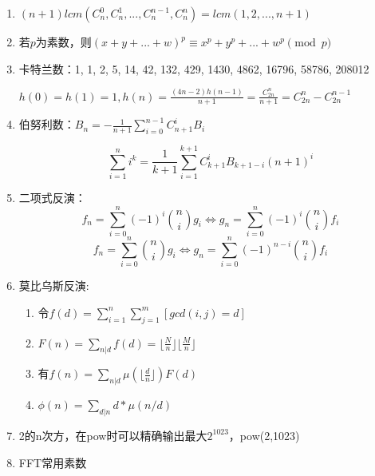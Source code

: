 \documentclass[twoside]{article}
\begin{document}
\begin{enumerate}
\item $(n+1)lcm(C_n^0,C_n^1,...,C_n^{n-1},C_n^{n})=lcm(1,2,...,n+1)$

\item 若$p$为素数，则$(x+y+...+w)^p\equiv x^p+y^p+...+w^p\pmod p$

\item 卡特兰数：1, 1, 2, 5, 14, 42, 132, 429, 1430, 4862, 16796, 58786, 208012

$h(0)=h(1)=1,h(n)=\frac{(4n-2)h(n-1)}{n+1}=\frac{C_{2n}^n}{n+1}=C_{2n}^n-C_{2n}^{n-1}$

\item 伯努利数：$B_n = -\frac{1}{n+1} \sum_{i=0}^{n-1} C_{n+1}^i B_i$

$$\sum_{i=1}^n i^k = \frac{1}{k+1} \sum_{i=1}^{k+1}C_{k+1}^i B_{k+1-i}(n+1)^i$$

\item 二项式反演：$$f_n = \sum_{i = 0} ^ n (-1) ^ i \binom{n}{i} g_i \Leftrightarrow g_n = \sum_{i = 0} ^ n (-1) ^ i \binom{n}{i} f_i$$
$$f_n = \sum_{i = 0} ^ n \binom{n}{i} g_i \Leftrightarrow g_n = \sum_{i = 0} ^ n (-1) ^ {n - i} \binom{n}{i} f_i$$

\item 莫比乌斯反演:
\begin{enumerate}
\item 令$f(d)=\sum_{i=1}^{n}\sum_{j=1}^{m}[gcd(i,j)=d]$
\item $F(n)=\sum_{n|d}f(d)=\lfloor\frac{N}{n}\rfloor\lfloor\frac{M}{n}\rfloor$
\item 有$f(n)=\sum_{n|d}\mu(\lfloor\frac{d}{n}\rfloor)F(d)$
\item $\phi(n)=\sum_{d|n}d*\mu(n/d)$
\end{enumerate}


\item 2的n次方，在pow时可以精确输出最大$2^1023$，pow(2,1023)

\item FFT常用素数


\end{enumerate}
\end{document}
